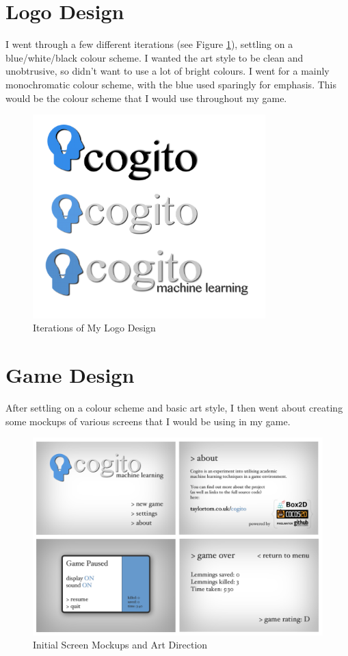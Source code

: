 \documentclass[a4paper,oneside]{report}
\begin{document}
\section{Logo Design}
	
I went through a few different iterations (see Figure \ref{fig:Logos}), settling on a blue/white/black colour scheme. I wanted the art style to be clean and unobtrusive, so didn't want to use a lot of bright colours. I went for a mainly monochromatic colour scheme, with the blue used sparingly for emphasis. This would be the colour scheme that I would use throughout my game.
	
\begin{figure}[h!]
  \centering
    \includegraphics[width=90mm]{sources/images/cogito_logo1}
    \caption{Iterations of My Logo Design}
    \label{fig:Logos}
\end{figure}

\section{Game Design}

After settling on a colour scheme and basic art style, I then went about creating some mockups of various screens that I would be using in my game.
	
\begin{figure}[h!]
  \centering
    \includegraphics[width=140mm]{sources/images/Screens}
    \caption{Initial Screen Mockups and Art Direction}
\end{figure}
\end{document}
